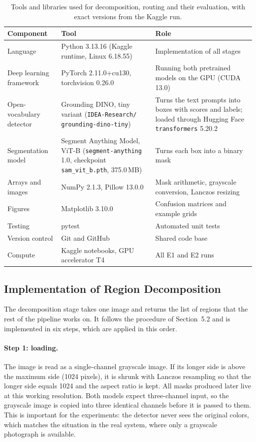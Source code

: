 \documentclass{FastFyp}
\begin{document}
\begin{table}[!ht]
\centering
\caption{Tools and libraries used for decomposition, routing and their evaluation, with exact versions from the Kaggle run.}
\label{tab:a_tools}
\begin{tabular}{|p{2.6cm}|>{\raggedright\arraybackslash}p{5.4cm}|>{\raggedright\arraybackslash}p{4.4cm}|}
\hline
\textbf{Component} & \textbf{Tool} & \textbf{Role} \\ \hline
Language & Python 3.13.16 (Kaggle runtime, Linux 6.18.55) & Implementation of all stages \\ \hline
Deep learning framework & PyTorch 2.11.0+cu130, torchvision 0.26.0 & Running both pretrained models on the GPU (CUDA 13.0) \\ \hline
Open-vocabulary detector & Grounding DINO, tiny variant (\texttt{IDEA-Research/} \texttt{grounding-dino-tiny}) \cite{liu2024groundingdino} & Turns the text prompts into boxes with scores and labels; loaded through Hugging Face \texttt{transformers} 5.20.2 \\ \hline
Segmentation model & Segment Anything Model, ViT-B (\texttt{segment-anything} 1.0, checkpoint \texttt{sam\_vit\_b.pth}, 375.0\,MB) \cite{kirillov2023sam} & Turns each box into a binary mask \\ \hline
Arrays and images & NumPy 2.1.3, Pillow 13.0.0 & Mask arithmetic, grayscale conversion, Lanczos resizing \\ \hline
Figures & Matplotlib 3.10.0 & Confusion matrices and example grids \\ \hline
Testing & pytest & Automated unit tests \\ \hline
Version control & Git and GitHub & Shared code base \\ \hline
Compute & Kaggle notebooks, GPU accelerator T4 & All E1 and E2 runs \\ \hline
\end{tabular}
\end{table}


\subsection{Implementation of Region Decomposition}
The decomposition stage takes one image and returns the list of regions that the rest of the pipeline works on. It follows the procedure of Section~5.2 and is implemented in six steps, which are applied in this order.
 
\paragraph{Step 1: loading.} The image is read as a single-channel grayscale image. If its longer side is above the maximum side (1024 pixels), it is shrunk with Lanczos resampling so that the longer side equals 1024 and the aspect ratio is kept. All masks produced later live at this working resolution. Both models expect three-channel input, so the grayscale image is copied into three identical channels before it is passed to them. This is important for the experiments: the detector never sees the original colors, which matches the situation in the real system, where only a grayscale photograph is available.
 
\end{document}
